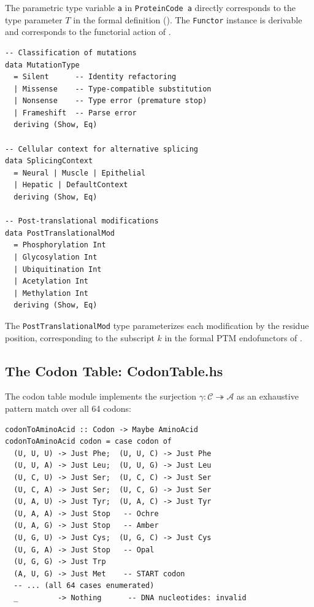 \documentclass[12pt,a4paper]{article}
\theoremstyle{definition}
\begin{document}
The parametric type variable \texttt{a} in \texttt{ProteinCode a} directly corresponds to the type parameter $T$ in the formal definition (). The \texttt{Functor} instance is derivable and corresponds to the functorial action of .

\begin{lstlisting}[caption={Mutation, splicing, and PTM types (ProteinCode.hs)},label=lst:mutation-types]
-- Classification of mutations
data MutationType
  = Silent      -- Identity refactoring
  | Missense    -- Type-compatible substitution
  | Nonsense    -- Type error (premature stop)
  | Frameshift  -- Parse error
  deriving (Show, Eq)

-- Cellular context for alternative splicing
data SplicingContext
  = Neural | Muscle | Epithelial
  | Hepatic | DefaultContext
  deriving (Show, Eq)

-- Post-translational modifications
data PostTranslationalMod
  = Phosphorylation Int
  | Glycosylation Int
  | Ubiquitination Int
  | Acetylation Int
  | Methylation Int
  deriving (Show, Eq)
\end{lstlisting}

The \texttt{PostTranslationalMod} type parameterizes each modification by the residue position, corresponding to the subscript $k$ in the formal PTM endofunctors of .

\subsection{The Codon Table: CodonTable.hs}\label{sec:impl-codontable}

The codon table module implements the surjection $\gamma \colon \mathcal{C} \twoheadrightarrow \mathcal{A}$ as an exhaustive pattern match over all 64 codons:

\begin{lstlisting}[caption={Codon table lookup (CodonTable.hs, excerpt)},label=lst:codon-table]
codonToAminoAcid :: Codon -> Maybe AminoAcid
codonToAminoAcid codon = case codon of
  (U, U, U) -> Just Phe;  (U, U, C) -> Just Phe
  (U, U, A) -> Just Leu;  (U, U, G) -> Just Leu
  (U, C, U) -> Just Ser;  (U, C, C) -> Just Ser
  (U, C, A) -> Just Ser;  (U, C, G) -> Just Ser
  (U, A, U) -> Just Tyr;  (U, A, C) -> Just Tyr
  (U, A, A) -> Just Stop   -- Ochre
  (U, A, G) -> Just Stop   -- Amber
  (U, G, U) -> Just Cys;  (U, G, C) -> Just Cys
  (U, G, A) -> Just Stop   -- Opal
  (U, G, G) -> Just Trp
  (A, U, G) -> Just Met    -- START codon
  -- ... (all 64 cases enumerated)
  _         -> Nothing      -- DNA nucleotides: invalid
\end{lstlisting}
\end{document}

